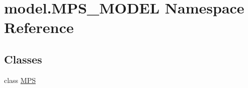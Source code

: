 \hypertarget{namespacemodel_1_1MPS__MODEL}{}\section{model.\+M\+P\+S\+\_\+\+M\+O\+D\+E\+L Namespace Reference}
\label{namespacemodel_1_1MPS__MODEL}
\subsection*{Classes}
\begin{DoxyCompactItemize}
\item 
class \hyperlink{classmodel_1_1MPS__MODEL_1_1MPS}{M\+P\+S}
\end{DoxyCompactItemize}

